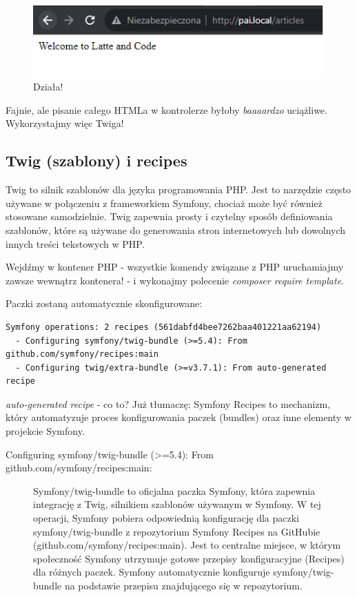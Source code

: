 \documentclass[polish, a4paper]{article}
\begin{document}
\begin{figure}[H]
  \centering
  \includegraphics[width=\textwidth]{articles.png}
  \caption{Działa!}
\end{figure}

Fajnie, ale pisanie całego HTMLa w kontrolerze byłoby \emph{baaaardzo} uciążliwe. Wykorzystajmy więc Twiga!

\subsection{Twig (szablony) i recipes}

Twig to silnik szablonów dla języka programowania PHP. Jest to narzędzie często używane w połączeniu z frameworkiem Symfony, chociaż może być również stosowane samodzielnie. Twig zapewnia prosty i czytelny sposób definiowania szablonów, które są używane do generowania stron internetowych lub dowolnych innych treści tekstowych w PHP.

Wejdźmy w kontener PHP - wszystkie komendy związane z PHP uruchamiajmy zawsze wewnątrz kontenera! - i wykonajmy polecenie \emph{composer require template}.

Paczki zostaną automatycznie skonfigurowane:

\begin{verbatim}
Symfony operations: 2 recipes (561dabfd4bee7262baa401221aa62194)
  - Configuring symfony/twig-bundle (>=5.4): From github.com/symfony/recipes:main
  - Configuring twig/extra-bundle (>=v3.7.1): From auto-generated recipe
\end{verbatim}


\emph{auto-generated recipe} - co to? Już tłumaczę: Symfony Recipes to mechanizm, który automatyzuje proces konfigurowania paczek (bundles) oraz inne elementy w projekcie Symfony. 

\begin{description}

\item[Configuring symfony/twig-bundle (>=5.4): From github.com/symfony/recipes:main:]{
Symfony/twig-bundle to oficjalna paczka Symfony, która zapewnia integrację z Twig, silnikiem szablonów używanym w Symfony. W tej operacji, Symfony pobiera odpowiednią konfigurację dla paczki symfony/twig-bundle z repozytorium Symfony Recipes na GitHubie (github.com/symfony/recipes:main). Jest to centralne miejsce, w którym społeczność Symfony utrzymuje gotowe przepisy konfiguracyjne (Recipes) dla różnych paczek. Symfony automatycznie konfiguruje symfony/twig-bundle na podstawie przepisu znajdującego się w repozytorium.}

\end{description}
\end{document}
